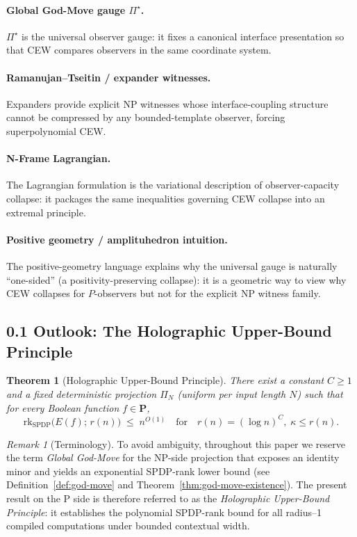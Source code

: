 \documentclass[12pt]{article}
\newtheorem{theorem}{Theorem}
\theoremstyle{definition}
\theoremstyle{definition}
\theoremstyle{remark}
\newtheorem{remark}{Remark}
\theoremstyle{remark}
\begin{document}
\paragraph{Global God-Move gauge $\Pi^\star$.}
$\Pi^\star$ is the universal observer gauge: it fixes a canonical interface presentation so that
CEW compares observers in the same coordinate system.

\paragraph{Ramanujan--Tseitin / expander witnesses.}
Expanders provide explicit NP witnesses whose interface-coupling structure cannot be compressed
by any bounded-template observer, forcing superpolynomial CEW.

\paragraph{N-Frame Lagrangian.}
The Lagrangian formulation is the variational description of observer-capacity collapse: it
packages the same inequalities governing CEW collapse into an extremal principle.

\paragraph{Positive geometry / amplituhedron intuition.}
The positive-geometry language explains why the universal gauge is naturally ``one-sided'' (a
positivity-preserving collapse): it is a geometric way to view why CEW collapses for $P$-observers
but not for the explicit NP witness family.

\subsection*{0.1 Outlook: The Holographic Upper-Bound Principle}

\begin{theorem}[Holographic Upper-Bound Principle]
\label{thm:global-god-move}
There exist a constant $C \ge 1$ and a fixed deterministic projection
$\Pi_N$ (uniform per input length $N$) such that for every Boolean
function $f \in \mathbf{P}$,
\[
\mathrm{rk}_{\mathrm{SPDP}}\big(E(f);\, r(n)\big) \; \le \; n^{O(1)}
\quad\text{for}\quad
r(n) = (\log n)^C,\; \kappa \le r(n).
\]
\end{theorem}

\begin{remark}[Terminology]
To avoid ambiguity, throughout this paper we reserve the term
\emph{Global God-Move} for the NP-side projection that exposes an
identity minor and yields an exponential SPDP-rank lower bound
(see Definition~\ref{def:god-move} and Theorem~\ref{thm:god-move-existence}).
The present result on the P side is therefore referred to as the
\emph{Holographic Upper-Bound Principle}:
it establishes the polynomial SPDP-rank bound for all
radius--1 compiled computations under bounded contextual width.
\end{remark}
\end{document}
